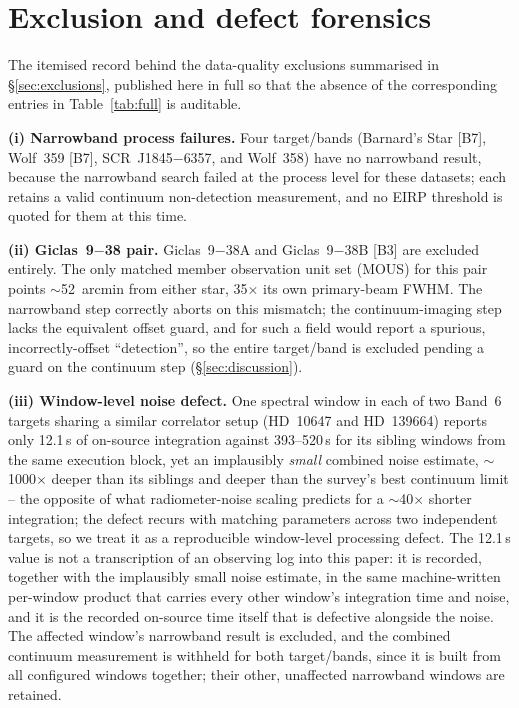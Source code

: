\documentclass{openjournal}
\begin{document}
\section{Exclusion and defect forensics}
\label{app:exclusions}

The itemised record behind the data-quality exclusions summarised in
\S\ref{sec:exclusions}, published here in full so that the absence of
the corresponding entries in Table~\ref{tab:full} is auditable.

\textbf{(i) Narrowband process failures.} Four target/bands
(Barnard's Star [B7], Wolf~359 [B7], SCR~J1845$-$6357, and Wolf~358)
have no narrowband result, because the narrowband search failed at the
process level for these datasets; each retains a valid continuum
non-detection measurement, and no EIRP threshold is quoted for them at
this time.

\textbf{(ii) Giclas~9$-$38 pair.} Giclas~9$-$38A and
Giclas~9$-$38B [B3] are excluded entirely. The only matched member
observation unit set (MOUS) for this pair points $\sim$52~arcmin from
either star, 35$\times$ its own primary-beam FWHM. The narrowband step
correctly aborts on this mismatch; the continuum-imaging step lacks
the equivalent offset guard, and for such a field would report a
spurious, incorrectly-offset ``detection'', so the entire target/band
is excluded pending a guard on the continuum step
(\S\ref{sec:discussion}).

\textbf{(iii) Window-level noise defect.} One spectral window in each
of two Band~6 targets sharing a similar correlator setup (HD~10647 and
HD~139664) reports only 12.1\,s of on-source integration against
393--520\,s for its sibling windows from the same execution block, yet
an implausibly \emph{small} combined noise estimate,
$\sim$1000$\times$ deeper than its siblings and deeper than the
survey's best continuum limit -- the opposite of what radiometer-noise
scaling predicts for a $\sim$40$\times$ shorter integration; the
defect recurs with matching parameters across two independent targets,
so we treat it as a reproducible window-level processing defect. The
12.1\,s value is not a transcription of an observing log into this
paper: it is recorded, together with the implausibly small noise
estimate, in the same machine-written per-window product that carries
every other window's integration time and noise, and it is the
recorded on-source time itself that is defective alongside the noise.
The affected window's narrowband result is excluded, and the combined
continuum measurement is withheld for both target/bands, since it is
built from all configured windows together; their other, unaffected
narrowband windows are retained.
\end{document}
